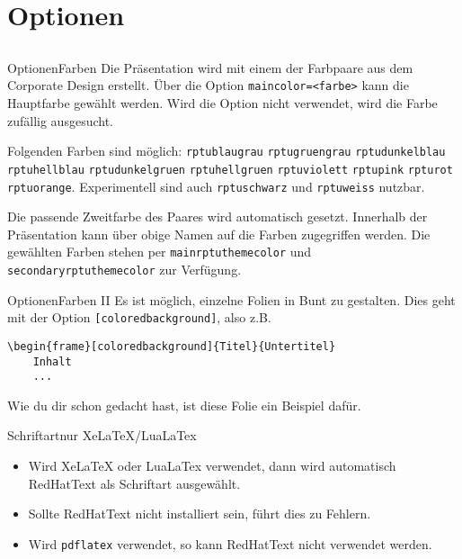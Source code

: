 \documentclass[german,10pt,xcolor=colortbl,compress
]{beamer}
\begin{document}
\section{Optionen}
\subsection*{}
\newcommand{\farbe}[1]{{\color{#1}\lstinline|#1|}}
\begin{frame}{Optionen}{Farben}
	Die Präsentation wird mit einem der Farbpaare aus dem Corporate Design erstellt. Über die Option \lstinline!maincolor=<farbe>! kann die Hauptfarbe gewählt werden. Wird die Option nicht verwendet, wird die Farbe zufällig ausgesucht. \par
	Folgenden Farben sind möglich:
	\farbe{rptublaugrau} \farbe{rptugruengrau} \farbe{rptudunkelblau} \farbe{rptuhellblau}
	\farbe{rptudunkelgruen} \farbe{rptuhellgruen} \farbe{rptuviolett} \farbe{rptupink}
	\farbe{rpturot} \farbe{rptuorange}. Experimentell sind auch \farbe{rptuschwarz} und \color{black}\lstinline!rptuweiss! nutzbar.\par
	Die passende Zweitfarbe des Paares wird automatisch gesetzt. Innerhalb der Präsentation kann über obige Namen auf die Farben zugegriffen werden. Die gewählten Farben stehen per \farbe{mainrptuthemecolor} und \farbe{secondaryrptuthemecolor} zur Verfügung. \par
\end{frame}
\begin{frame}{Optionen}{Farben II}
	Es ist möglich, einzelne Folien in Bunt zu gestalten. Dies geht mit der Option \lstinline![coloredbackground]!, also z.B.
	\begin{lstlisting}
\begin{frame}[coloredbackground]{Titel}{Untertitel}
	Inhalt
	...
\end{lstlisting}
	Wie du dir schon gedacht hast, ist diese Folie ein Beispiel dafür.
\end{frame}
\begin{frame}{Schriftart}{nur XeLaTeX/LuaLaTex}
	\begin{itemize}
		\item Wird XeLaTeX oder LuaLaTex verwendet, dann wird automatisch RedHatText als Schriftart ausgewählt.
		\item Sollte RedHatText nicht installiert sein, führt dies zu Fehlern.
		\item Wird \lstinline!pdflatex! verwendet, so kann RedHatText nicht verwendet werden.
	\end{itemize}
\end{frame}
\end{document}
